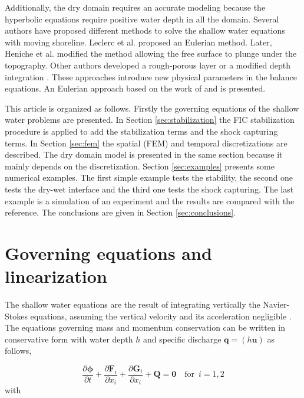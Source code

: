 \documentclass[a4paper,12pt]{elsarticle}
\newcommand{\pder}[2]{\frac{\partial#1}{\partial#2}}
\begin{document}
Additionally, the dry domain requires an accurate modeling because the hyperbolic equations require positive water depth in all the domain.
Several authors have proposed different methods to solve the shallow water equations with moving shoreline. Leclerc et al. \cite{leclerc1990} proposed an Eulerian method. Later, Heniche et al. \cite{heniche2000} modified the method allowing the free surface to plunge under the topography.
Other authors developed a rough-porous layer \cite{candy2017,barros2011} or a modified depth integration \cite{defina2000}. These approaches introduce new physical parameters in the balance equations.
An Eulerian approach based on the work of \cite{leclerc1990} and \cite{heniche2000} is presented.


This article is organized as follows. Firstly the governing equations of the shallow water problems are presented.
In Section \ref{sec:stabilization} the FIC stabilization procedure is applied to add the stabilization terms and the shock capturing terms.
In Section \ref{sec:fem} the spatial (FEM) and temporal discretizations are described.
The dry domain model is presented in the same section because it mainly depends on the discretization.
Section \ref{sec:examples} presents some numerical examples.
The first simple example tests the stability, the second one tests the dry-wet interface and the third one tests the shock capturing.
The last example is a simulation of an experiment and the results are compared with the reference.
The conclusions are given in Section \ref{sec:conclusions}.



\section{Governing equations and linearization}
\label{sec:equations}

The shallow water equations are the result of integrating vertically the Navier-Stokes equations, assuming the vertical velocity and its acceleration negligible \cite{abbot1979,zien3}.
The equations governing mass and momentum conservation can be written in conservative form with water depth $h$ and specific discharge $\mathbf{q}=(h\mathbf{u})$ as follows,

\begin{equation} \label{general_sw}
\pder{\bm{\phi}}{t} + \pder{\mathbf{F}_i}{x_i} + \pder{\mathbf{G}_i}{x_i} + \mathbf{Q} = \mathbf{0} \quad \text{for} \enspace i=1,2
\end{equation}
with
\end{document}
